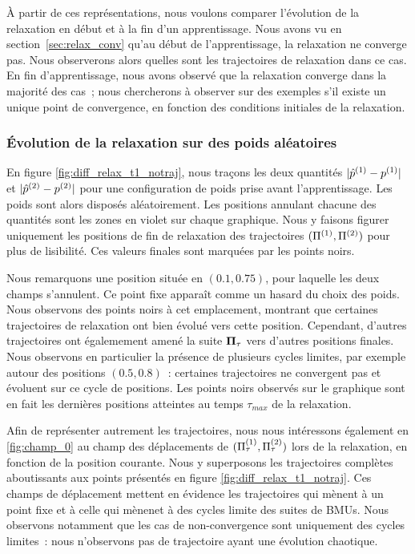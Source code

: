 \documentclass[../main]{subfiles}
\begin{document}
\`A partir de ces représentations, nous voulons comparer l'évolution de la relaxation en début et à la fin d'un apprentissage. 
Nous avons vu en section~\ref{sec:relax_conv} qu'au début de l'apprentissage, la relaxation ne converge pas. Nous observerons alors quelles sont les trajectoires de relaxation dans ce cas.
En fin d'apprentissage, nous avons observé que la relaxation converge dans la majorité des cas~; nous chercherons à observer sur des exemples s'il existe un unique point de convergence, en fonction des conditions initiales de la relaxation.

\subsubsection{\'Evolution de la relaxation sur des poids aléatoires}

En figure \ref{fig:diff_relax_t1_notraj}, nous traçons les deux quantités $\lvert \hat{p}^{({1})} - p^{({1})} \rvert$ et $\lvert \hat{p}^{({2})} - p^{({2})}\rvert$ pour une configuration de poids prise avant l'apprentissage. Les poids sont alors disposés aléatoirement.
Les positions annulant chacune des quantités sont les zones en violet sur chaque graphique.
Nous y faisons figurer uniquement les positions de fin de relaxation des trajectoires $(\Pi^{({1})},\Pi^{({2})})$ pour plus de lisibilité. Ces valeurs finales sont marquées par les points noirs.

Nous remarquons une position située en $(0.1, 0.75)$, pour laquelle les deux champs s'annulent. Ce point fixe apparaît comme un hasard du choix des poids.
Nous observons des points noirs à cet emplacement, montrant que certaines trajectoires de relaxation ont bien évolué vers cette position. 
Cependant, d'autres trajectoires ont égalemement amené la suite $\mathbf{\Pi}_\tau$ vers d'autres positions finales.
Nous observons en particulier la présence de plusieurs cycles limites, par exemple autour des positions $(0.5, 0.8)$~: certaines trajectoires ne convergent pas et évoluent sur ce cycle de positions. Les points noirs observés sur le graphique sont en fait les dernières positions atteintes au temps $\tau_{max}$ de la relaxation.

Afin de représenter autrement les trajectoires, nous nous intéressons également en \ref{fig:champ_0} au champ des déplacements de $(\Pi^{({1})}_\tau,\Pi^{({2})}_\tau)$ lors de la relaxation, en fonction de la position courante. 
Nous y superposons les trajectoires complètes aboutissants aux points présentés en figure \ref{fig:diff_relax_t1_notraj}.
Ces champs de déplacement mettent en évidence les trajectoires qui mènent à un point fixe et à celle qui mènenet à des cycles limite des suites de BMUs.
Nous observons notamment que les cas de non-convergence sont uniquement des cycles limites~: nous n'observons pas de trajectoire ayant une évolution chaotique.
\end{document}
